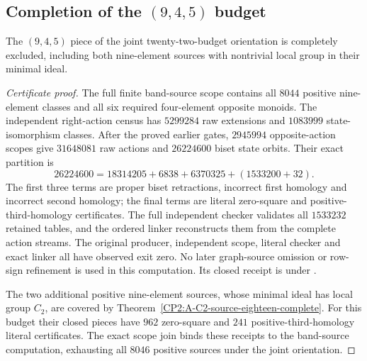 \subsection{Completion of the $(9,4,5)$ budget}

\begin{proposition}
\label{CP2:A-oriented-eighteen-nine-four-five}
The $(9,4,5)$ piece of the joint twenty-two-budget orientation is
completely excluded, including both nine-element sources with
nontrivial local group in their minimal ideal.
\end{proposition}
\begin{proof}[Certificate proof]
The full finite band-source scope contains all $8044$ positive
nine-element classes and all six required four-element opposite
monoids.  The independent right-action census has $5299284$ raw
extensions and $1083999$ state-isomorphism classes.  After the proved
earlier gates, $2945994$ opposite-action scopes give $31648081$ raw
actions and $26224600$ biset state orbits.  Their exact partition is
\[
 26224600=18314205+6838+6370325+(1533200+32).
\]
The first three terms are proper biset retractions, incorrect first
homology and incorrect second homology; the final terms are literal
zero-square and positive-third-homology certificates.  The full
independent checker validates all $1533232$ retained tables, and the
ordered linker reconstructs them from the complete action streams.
The original producer, independent scope, literal checker and exact
linker all have observed exit zero.  No later graph-source omission or
row-sign refinement is used in this computation.  Its closed receipt
is  under
.

The two additional positive nine-element sources, whose minimal ideal
has local group $C_2$, are covered by
Theorem~\ref{CP2:A-C2-source-eighteen-complete}.  For this budget their
closed pieces have $962$ zero-square and $241$
positive-third-homology literal certificates.  The exact scope join
binds these receipts to the band-source computation, exhausting all
$8046$ positive sources under the joint orientation.
\end{proof}
